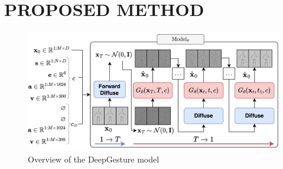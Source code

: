 \section{PROPOSED METHOD}
\label{sec:system_overview}

\begin{figure}[h]
	\centering
	\includegraphics[width=0.7\linewidth]{figures/AllStage}
	\caption{Overview of the DeepGesture model}
	\label{fig:TrainingAndSampling}
\end{figure}

